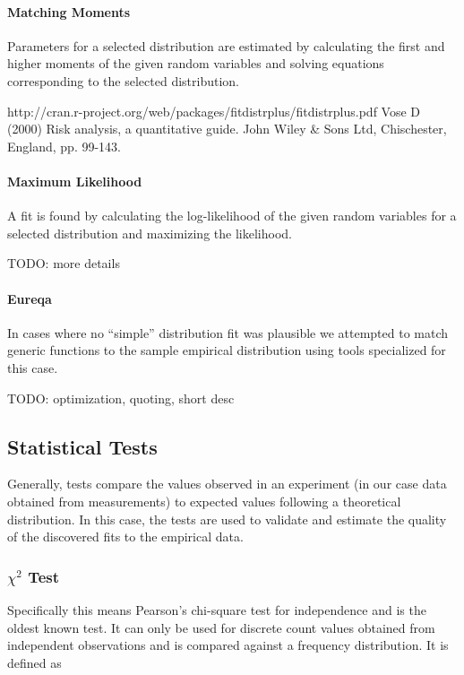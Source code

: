 \paragraph{Matching Moments}
Parameters for a selected distribution are estimated by calculating the first and higher moments of the given random variables and solving equations corresponding to the selected distribution.


http://cran.r-project.org/web/packages/fitdistrplus/fitdistrplus.pdf
Vose D (2000) Risk analysis, a quantitative guide. John Wiley \& Sons Ltd, Chischester, England,
pp. 99-143.

\paragraph{Maximum Likelihood}
A fit is found by calculating the log-likelihood of the given random variables for a selected distribution and maximizing the likelihood.

TODO: more details


\paragraph{Eureqa}
In cases where no ``simple'' distribution fit was plausible we attempted to match generic functions to the sample empirical distribution using tools specialized for this case.

TODO: optimization, quoting, short desc




\subsection{Statistical Tests}

Generally, tests compare the values observed in an experiment (in our case data obtained from measurements) to expected values following a theoretical distribution. In this case, the tests are used to validate and estimate the quality of the discovered fits to the empirical data.




\subsubsection{$\chi^2$ Test}


Specifically this means Pearson's chi-square test for independence\cite{doi:10.1080/14786440009463897} and is the oldest known test. It can only be used for discrete count values obtained from independent observations and is compared against a frequency distribution. It is defined as

